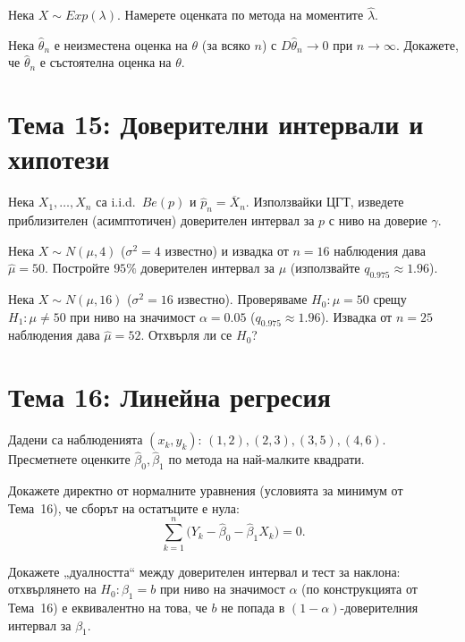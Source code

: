 \begin{probbox}[Задача 14.2]
Нека $X\sim Exp(\lambda)$. Намерете оценката по метода на моментите
$\hat\lambda$.
\end{probbox}

\begin{probbox}[Задача 14.3]
Нека $\hat\theta_n$ е неизместена оценка на $\theta$ (за всяко $n$) с
$D\hat\theta_n\to0$ при $n\to\infty$. Докажете, че $\hat\theta_n$ е
състоятелна оценка на $\theta$.
\end{probbox}

\section*{Тема 15: Доверителни интервали и хипотези}

\begin{probbox}[Задача 15.1]
Нека $X_1,\dots,X_n$ са i.i.d.\ $Be(p)$ и $\hat p_n=\overline X_n$.
Използвайки ЦГТ, изведете приблизителен (асимптотичен) доверителен
интервал за $p$ с ниво на доверие $\gamma$.
\end{probbox}

\begin{probbox}[Задача 15.2]
Нека $X\sim N(\mu,4)$ ($\sigma^2=4$ известно) и извадка от $n=16$
наблюдения дава $\hat\mu=50$. Постройте $95\%$ доверителен интервал
за $\mu$ (използвайте $q_{0.975}\approx1.96$).
\end{probbox}

\begin{probbox}[Задача 15.3]
Нека $X\sim N(\mu,16)$ ($\sigma^2=16$ известно). Проверяваме $H_0:
\mu=50$ срещу $H_1:\mu\neq50$ при ниво на значимост $\alpha=0.05$
($q_{0.975}\approx1.96$). Извадка от $n=25$ наблюдения дава
$\hat\mu=52$. Отхвърля ли се $H_0$?
\end{probbox}

\section*{Тема 16: Линейна регресия}

\begin{probbox}[Задача 16.1]
Дадени са наблюденията $(x_k,y_k)$: $(1,2),(2,3),(3,5),(4,6)$.
Пресметнете оценките $\hat\beta_0,\hat\beta_1$ по метода на
най-малките квадрати.
\end{probbox}

\begin{probbox}[Задача 16.2]
Докажете директно от нормалните уравнения (условията за минимум от
Тема~16), че сборът на остатъците е нула:
\[
  \sum_{k=1}^n\big(Y_k-\hat\beta_0-\hat\beta_1X_k\big) = 0.
\]
\end{probbox}

\begin{probbox}[Задача 16.3]
Докажете „дуалността“ между доверителен интервал и тест за наклона:
отхвърлянето на $H_0:\beta_1=b$ при ниво на значимост $\alpha$ (по
конструкцията от Тема~16) е еквивалентно на това, че $b$ не попада в
$(1-\alpha)$-доверителния интервал за $\beta_1$.
\end{probbox}
